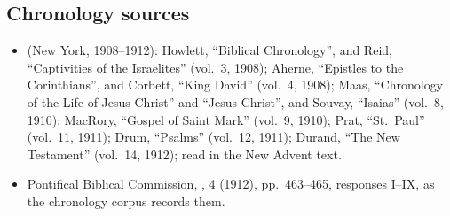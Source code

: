 {\subsection*{Chronology sources}
\begin{itemize}[itemsep=0pt,topsep=.25em]
\item {} (New York, 1908--1912): Howlett, ``Biblical Chronology'', and Reid, ``Captivities of the Israelites'' (vol.~3, 1908); Aherne, ``Epistles to the Corinthians'', and Corbett, ``King David'' (vol.~4, 1908); Maas, ``Chronology of the Life of Jesus Christ'' and ``Jesus Christ'', and Souvay, ``Isaias'' (vol.~8, 1910); MacRory, ``Gospel of Saint Mark'' (vol.~9, 1910); Prat, ``St.~Paul'' (vol.~11, 1911); Drum, ``Psalms'' (vol.~12, 1911); Durand, ``The New Testament'' (vol.~14, 1912); read in the New Advent text.
\item Pontifical Biblical Commission, ,  4 (1912), pp.~463--465, responses I--IX, as the chronology corpus records them.
\end{itemize}
\par}
